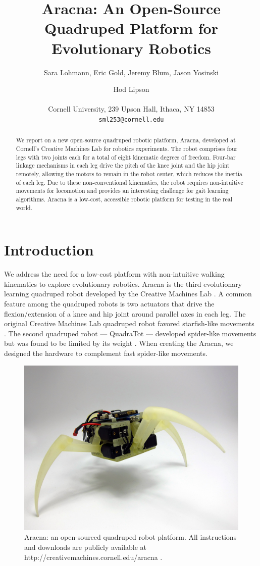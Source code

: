\documentclass[letterpaper]{article}
\title{Aracna: An Open-Source Quadruped Platform for Evolutionary Robotics}
\author{Sara Lohmann, Eric Gold, Jeremy Blum, Jason Yosinski \and Hod Lipson \\
\mbox{}\\
Cornell University, 239 Upson Hall, Ithaca, NY 14853 \\
\texttt{sml253@cornell.edu}}
\begin{document}
\maketitle

\begin{abstract}
We report on a new open-source quadruped robotic platform, Aracna,
developed at Cornell's Creative Machines Lab for robotics
experiments. The robot comprises four legs with two joints each for a
total of eight kinematic degrees of freedom. Four-bar linkage
mechanisms in each leg drive the pitch of the knee joint and the hip
joint remotely, allowing the motors to remain in the robot center,
which reduces the inertia of each leg. Due to these non-conventional
kinematics, the robot requires non-intuitive movements for locomotion
and provides an interesting challenge for gait learning
algorithms. Aracna is a low-cost, accessible robotic platform for
testing in the real world.
\end{abstract}



\section{Introduction}

We address the need for a low-cost platform with non-intuitive walking
kinematics to explore evolutionary robotics. Aracna is the third
evolutionary learning quadruped robot developed by the Creative
Machines Lab \citep{HL, JY}. A common feature among the quadruped
robots is two actuators that drive the flexion/extension of a knee and
hip joint around parallel axes in each leg. The original Creative
Machines Lab quadruped robot favored starfish-like movements
\citep{HL}. The second quadruped robot --- QuadraTot ---
developed spider-like movements but was found to be limited by its
weight \citep{JY}. When creating the Aracna, we designed the hardware to
complement fast spider-like movements.

\begin{figure}[t]
\begin{center}
\includegraphics[width=.45\textwidth]{fig1.jpg}
\caption{Aracna: an open-sourced quadruped robot platform. All
  instructions and downloads are publicly available at
  http://creativemachines.cornell.edu/aracna .}
\label{fig1}
\end{center}
\end{figure}
\end{document}
